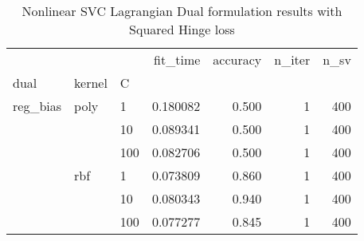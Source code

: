 \begin{table}[H]
\centering
\caption{Nonlinear SVC Lagrangian Dual formulation results with Squared Hinge loss}
\label{nonlinear_lagrangian_dual_l2_svc_cv_results}
\begin{tabular}{lllrrrr}
\toprule
         &     &     &  fit\_time &  accuracy &  n\_iter &  n\_sv \\
dual & kernel & C &           &           &         &       \\
\midrule
reg\_bias & poly & 1   &  0.180082 &     0.500 &       1 &   400 \\
         &     & 10  &  0.089341 &     0.500 &       1 &   400 \\
         &     & 100 &  0.082706 &     0.500 &       1 &   400 \\
         & rbf & 1   &  0.073809 &     0.860 &       1 &   400 \\
         &     & 10  &  0.080343 &     0.940 &       1 &   400 \\
         &     & 100 &  0.077277 &     0.845 &       1 &   400 \\
\bottomrule
\end{tabular}
\end{table}
